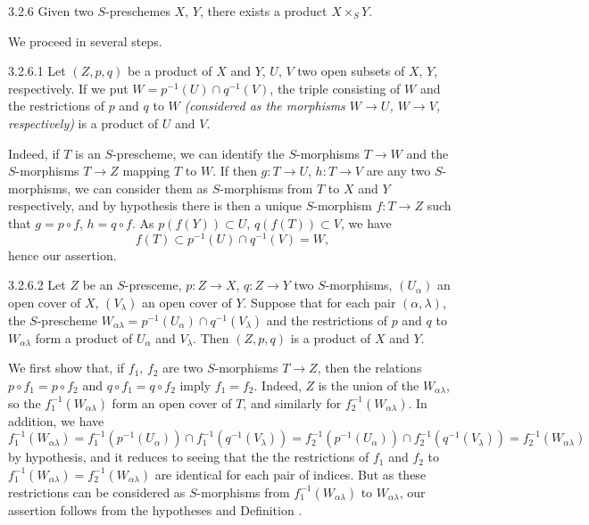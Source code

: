 \begin{envs}[Theorem]{3.2.6}
\label{thm-1.3.2.6}
Given two $S$-preschemes $X$, $Y$, there exists a product $X\times_S Y$.
\end{envs}

We proceed in several steps.

\begin{envs}[Lemma]{3.2.6.1}
\label{lem-1.3.2.6.1}
Let $(Z,p,q)$ be a product of $X$ and $Y$, $U$, $V$ two open subsets of $X$, $Y$,
respectively. If we put $W=p^{-1}(U)\cap q^{-1}(V)$, the triple consisting of $W$ and the
restrictions of $p$ and $q$ to $W$ \emph{(considered as the morphisms $W\to U$, $W\to V$,
respectively)} is a product of $U$ and $V$.
\end{envs}

Indeed, if $T$ is an $S$-prescheme, we can identify the $S$-morphisms $T\to W$ and the
$S$-morphisms $T\to Z$ mapping $T$ to $W$. If then $g:T\to U$, $h:T\to V$ are any two
$S$-morphisms, we can consider them as $S$-morphisms from $T$ to $X$ and $Y$ respectively,
and by hypothesis there is then a unique $S$-morphism $f:T\to Z$ such that $g=p\circ f$,
$h=q\circ f$. As $p(f(Y))\subset U$, $q(f(T))\subset V$, we have
\[
  f(T)\subset p^{-1}(U)\cap q^{-1}(V)=W,
\]
hence our assertion.

\begin{envs}[Lemma]{3.2.6.2}
\label{lem-1.3.2.6.2}
Let $Z$ be an $S$-presceme, $p:Z\to X$, $q:Z\to Y$ two $S$-morphisms, $(U_\alpha)$ an open
cover of $X$, $(V_\lambda)$ an open cover of $Y$. Suppose that for each pair
$(\alpha,\lambda)$, the $S$-prescheme
$W_{\alpha\lambda}=p^{-1}(U_\alpha)\cap q^{-1}(V_\lambda)$ and the restrictions of $p$ and
$q$ to $W_{\alpha\lambda}$ form a product of $U_\alpha$ and $V_\lambda$. Then $(Z,p,q)$ is a
product of $X$ and $Y$.
\end{envs}

We first show that, if $f_1$, $f_2$ are two $S$-morphisms $T\to Z$, then the relations
$p\circ f_1=p\circ f_2$ and $q\circ f_1=q\circ f_2$ imply $f_1=f_2$. Indeed, $Z$ is the union
of the $W_{\alpha\lambda}$, so the $f_1^{-1}(W_{\alpha\lambda})$ form an open cover of $T$,
and similarly for $f_2^{-1}(W_{\alpha\lambda})$. In addition, we have
\[
  f_1^{-1}(W_{\alpha\lambda})=f_1^{-1}(p^{-1}(U_\alpha))\cap f_1^{-1}(q^{-1}(V_\lambda))
  =f_2^{-1}(p^{-1}(U_\alpha))\cap f_2^{-1}(q^{-1}(V_\lambda))=f_2^{-1}(W_{\alpha\lambda})
\]
by hypothesis, and it reduces to seeing that the the restrictions of $f_1$ and $f_2$ to
$f_1^{-1}(W_{\alpha\lambda})=f_2^{-1}(W_{\alpha\lambda})$ are identical for each pair of
indices. But as these restrictions can be considered as $S$-morphisms from
$f_1^{-1}(W_{\alpha\lambda})$ to $W_{\alpha\lambda}$, our assertion follows from the
hypotheses and Definition .

